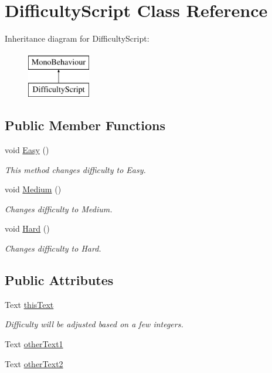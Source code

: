 \hypertarget{class_difficulty_script}{\section{Difficulty\-Script Class Reference}
\label{class_difficulty_script}
}
Inheritance diagram for Difficulty\-Script\-:\begin{figure}[H]
\begin{center}
\leavevmode
\includegraphics[height=2.000000cm]{class_difficulty_script}
\end{center}
\end{figure}
\subsection*{Public Member Functions}
\begin{DoxyCompactItemize}
\item 
void \hyperlink{class_difficulty_script_ad8913d5e49546c27235a5237a8338a48}{Easy} ()
\begin{DoxyCompactList}\small\item\em This method changes difficulty to Easy. \end{DoxyCompactList}\item 
void \hyperlink{class_difficulty_script_aaa1f844ba07536daad09d0d953f15ee9}{Medium} ()
\begin{DoxyCompactList}\small\item\em Changes difficulty to Medium. \end{DoxyCompactList}\item 
void \hyperlink{class_difficulty_script_a114d050f8e4c4bc684728ea9d4f143d1}{Hard} ()
\begin{DoxyCompactList}\small\item\em Changes difficulty to Hard. \end{DoxyCompactList}\end{DoxyCompactItemize}
\subsection*{Public Attributes}
\begin{DoxyCompactItemize}
\item 
Text \hyperlink{class_difficulty_script_a6cf366e11e24688822b51ad02a591d12}{this\-Text}
\begin{DoxyCompactList}\small\item\em Difficulty will be adjusted based on a few integers. \end{DoxyCompactList}\item 
Text \hyperlink{class_difficulty_script_ac35d383f05d94d0388dae2aa9544aeec}{other\-Text1}
\item 
Text \hyperlink{class_difficulty_script_a88e0b2f1fdb864f25e32c7945467befa}{other\-Text2}
\end{DoxyCompactItemize}
